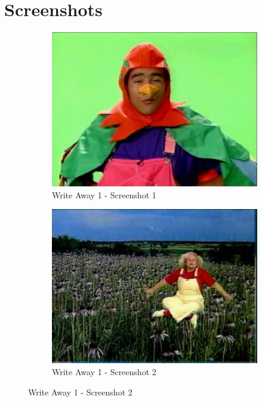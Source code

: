 \clearpage
\newpage

\section{Screenshots}

\begin{figure}[H]
    \centering
    \begin{subfigure}{0.45\textwidth}
        \centering
        \includegraphics[width=\linewidth]{Games/WriteAway/Images/WriteAway1Screenshot1.png}
        \caption{Write Away 1 - Screenshot 1}
    \end{subfigure}
    \begin{subfigure}{0.45\textwidth}
        \centering
        \includegraphics[width=\linewidth]{Games/WriteAway/Images/WriteAway1Screenshot2.png}
        \caption{Write Away 1 - Screenshot 2}
    \end{subfigure}


\end{figure}

